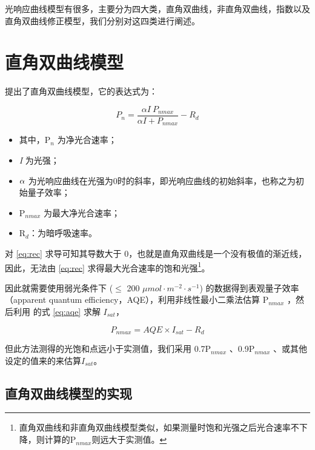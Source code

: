 \documentclass[]{krantz}
\providecommand{\tightlist}{%
  \setlength{\itemsep}{0pt}\setlength{\parskip}{0pt}}
\theoremstyle{definition}
\theoremstyle{definition}
\theoremstyle{definition}
\theoremstyle{remark}
\begin{document}
光响应曲线模型有很多，主要分为四大类，直角双曲线，非直角双曲线，指数以及直角双曲线修正模型，我们分别对这四类进行阐述。

\section{直角双曲线模型}\label{rec_mod}

\citet{BalyEC1935} 提出了直角双曲线模型，它的表达式为：

\begin{equation}
P_{n}  = \frac{\alpha I\ P_{nmax}}{\alpha I + P_{nmax}}- R_{d}
\label{eq:rec}
\end{equation}

\begin{itemize}
\tightlist
\item
  其中，P\(_{n}\) 为净光合速率；
\item
  \textsl{I} 为光强；
\item
  \(\text{\ensuremath{\alpha}}\)
  为光响应曲线在光强为0时的斜率，即光响应曲线的初始斜率，也称之为初始量子效率；
\item
  P\(_{nmax}\) 为最大净光合速率；
\item
  R\(_{d}\)：为暗呼吸速率。
\end{itemize}

对 \eqref{eq:rec} 求导可知其导数大于
0，也就是直角双曲线是一个没有极值的渐近线，因此，无法由 \eqref{eq:rec}
求得最大光合速率的饱和光强\footnote{直角双曲线和非直角双曲线模型类似，如果测量时饱和光强之后光合速率不下降，则计算的P\(_{nmax}\)则远大于实测值。}。

因此就需要使用弱光条件下 (\(\leq\) 200
\(\mu mol\cdot m^{-2}\cdot s^{-1}\)) 的数据得到表观量子效率（apparent
quantum efficiency，AQE），利用非线性最小二乘法估算 P\(_{nmax}\)
，然后利用 \citet{YEZiPiao2010} 的式 \eqref{eq:aqe} 求解 \(I_{sat}\)，

\begin{equation}
P_{nmax}= AQE \times I_{sat} - R_{d}
\label{eq:aqe}
\end{equation}

但此方法测得的光饱和点远小于实测值，我们采用 0.7P\(_{nmax}\)
\citet{ZhangXS2009}、0.9P\(_{nmax}\)
\citet{HuangHY2009}、或其他设定的值来的来估算\(I_{sat}\)。

\subsection{直角双曲线模型的实现}\label{rec_fit}
\end{document}
